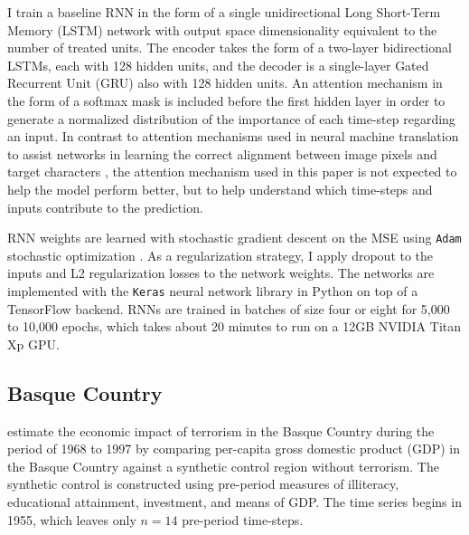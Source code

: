 \documentclass[hidelinks,12pt]{article}
\begin{document}
I train a baseline RNN in the form of a single unidirectional Long Short-Term Memory (LSTM) network \citep{schmidhuber1997long} with output space dimensionality equivalent to the number of treated units. The encoder takes the form of a two-layer bidirectional LSTMs, each with 128 hidden units, and the decoder is a single-layer Gated Recurrent Unit (GRU) \citep{chung2014} also with 128 hidden units. An attention mechanism in the form of a softmax mask is included before the first hidden layer in order to generate a normalized distribution of the importance of each time-step regarding an input. In contrast to attention mechanisms used in neural machine translation to assist networks in learning the correct alignment between image pixels and target characters \citep{cho2014learning,2017arXiv171204046P}, the attention mechanism used in this paper is not expected to help the model perform better, but to help understand which time-steps and inputs contribute to the prediction.

RNN weights are learned with stochastic gradient descent on the MSE using \texttt{Adam} stochastic optimization \citep{kingma2014adam}. As a regularization strategy, I apply dropout to the inputs and L2 regularization losses to the network weights. The networks are implemented with the \texttt{Keras} neural network library \citep{chollet2015keras} in Python on top of a TensorFlow backend. RNNs are trained in batches of size four or eight for 5,000 to 10,000 epochs, which takes about 20 minutes to run on a 12GB NVIDIA Titan Xp GPU.

\subsection{Basque Country} 


\citet{abadie2003economic} estimate the economic impact of terrorism in the Basque Country during the period of 1968 to 1997 by comparing per-capita gross domestic product (GDP) in the Basque Country against a synthetic control region without terrorism. The synthetic control is constructed using pre-period measures of illiteracy, educational attainment, investment, and means of GDP. The time series begins in 1955, which leaves only $n = 14$ pre-period time-steps. 
\end{document}

